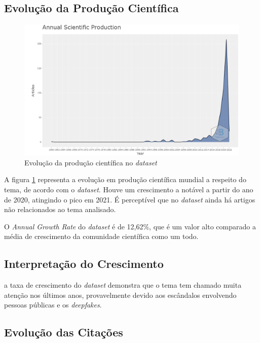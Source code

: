 \subsection{Evolução da Produção Científica}

\begin{figure}
    \centering
    \includegraphics[width=1\textwidth]{experiments/titofrota/PesquisaBibliometrica/Deepfakes/annual-plot.png}
    \caption{Evolução da produção científica no \textit{dataset}}
    \label{fig:evol:anual:DEEPFAKES@titofrota}
\end{figure}

A figura \ref{fig:evol:anual:DEEPFAKES@titofrota} representa a evolução em produção científica mundial a respeito do tema, de acordo com o \textit{dataset}. Houve um crescimento a notável a partir do ano de 2020, atingindo o pico em 2021. 
É perceptível que no \textit{dataset} ainda há artigos não relacionados ao tema analisado.

O \textit{Annual Growth Rate} do \textit{dataset} é de 12,62\%, que é um valor alto comparado a média de crescimento da comunidade científica como um todo.

\subsection{Interpretação do Crescimento} a taxa de crescimento do \textit{dataset} demonstra que o tema tem chamado muita atenção nos últimos anos, provavelmente devido aos escândalos envolvendo pessoas públicas e os \textit{deepfakes}.

\subsection{Evolução das Citações}

